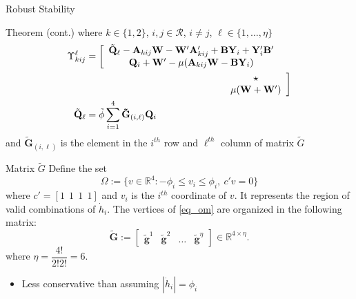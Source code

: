 \begin{frame}{Robust Stability}
    \begin{block}{Theorem (cont.)}
    where $k\in\{1,2\}$, $i,j \in \mathcal{R}$, $i \not= j$, $\ell \in \{1,\ldots, \eta\}$
\begin{align}
\Upsilon^{\ell}_{kij}&= 
\left[\begin{array}{c}
\tilde{\mathbf{Q}}_\ell-{\bf A}_{kij}{\bf W}-{\bf W}'{\bf A}'_{kij}+{\bf B}{\bf Y}_{i}+{\bf Y}'_{i}{\bf B}'\\
{\bf Q}_{i}+{\bf W}'-\mu({\bf A}_{kij}{\bf W}-{\bf B}{\bf Y}_{i}) \end{array}\right.\\
& \hspace{5cm} \left.\begin{array}{c}
\star\\
\mu({\bf W}+{\bf W}')\end{array}\right]\\
\tilde{\mathbf{Q}}_\ell &= \tilde{\phi} \sum^{4}_{i=1}\mathbf{\tilde G}_{(i,\ell)} \mathbf{Q}_i
\end{align}
and $\mathbf{\tilde G}_{(i,\ell)}$ is the  element in the  $i^{th}$ row and $\ell^{th}$ column of matrix $\tilde{G}$
    \end{block}
\end{frame}

\begin{frame}{Matrix $\tilde{G}$}
    Define the set
\begin{equation}\label{eq_om}
\Omega:=\{v \in \mathbb{R}^4: -\phi_i\leq v_{i}\leq \phi_i, ~c'v=0\}
\end{equation}
where $c'=[1~~1~~1~~1]$ and $v_i$ is the $i^{th}$ coordinate of $v$. It represents the region of valid combinations of $\dot{h}_i$. The vertices of \eqref{eq_om} are organized in the following matrix\autocite{Mozelli2018}:
\begin{equation}
    \label{m_v}
\mathbf{\tilde G}:=\left[\begin{array}{cccc}
\mathbf{\tilde g}^1 & \mathbf{\tilde g}^2 &\ldots
& \mathbf{\tilde g}^{\eta}  \end{array}\right] \in \mathbb{R}^{4\times\eta}.
\end{equation}
where $\eta=\dfrac{4!}{2!2!}=6$.

\begin{itemize}
    \item Less conservative than assuming $|\dot{h}_i| = \phi_i$
\end{itemize}
\end{frame}

